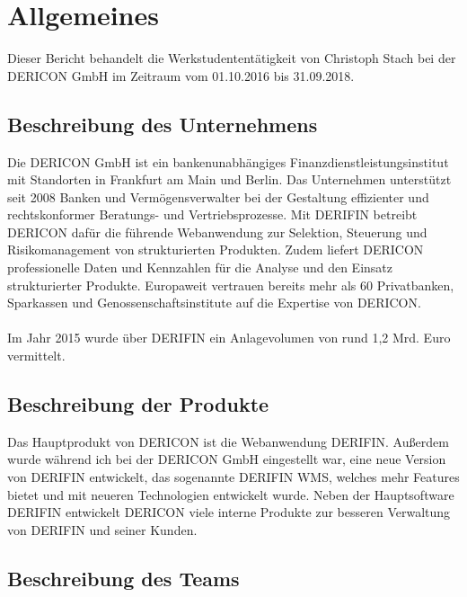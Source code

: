 \documentclass[chapterprefix=false, 12pt, a4paper, oneside, parskip=half, listof=totoc, bibliography=totoc, numbers=noendperiod]{scrbook}
\begin{document}
    \tableofcontents

    \chapter{Allgemeines}

    Dieser Bericht behandelt die Werkstudententätigkeit von Christoph Stach bei der DERICON GmbH im Zeitraum vom 01.10.2016 bis 31.09.2018.

    \section{Beschreibung des Unternehmens}

    Die DERICON GmbH ist ein bankenunabhängiges Finanzdienstleistungsinstitut mit Standorten in Frankfurt am Main und Berlin.
    Das Unternehmen unterstützt seit 2008 Banken und Vermögensverwalter bei der Gestaltung effizienter und rechtskonformer Beratungs- und Vertriebsprozesse.
    Mit DERIFIN betreibt DERICON dafür die führende Webanwendung zur Selektion, Steuerung und Risikomanagement von strukturierten Produkten.
    Zudem liefert DERICON professionelle Daten und Kennzahlen für die Analyse und den Einsatz strukturierter Produkte.
    Europaweit vertrauen bereits mehr als 60 Privatbanken, Sparkassen und Genossenschaftsinstitute auf die Expertise von DERICON.
    \\ \\
    Im Jahr 2015 wurde über DERIFIN ein Anlagevolumen von rund 1,2 Mrd. Euro vermittelt.

    \section{Beschreibung der Produkte}

    Das Hauptprodukt von DERICON ist die Webanwendung DERIFIN. Außerdem wurde während ich bei der DERICON GmbH eingestellt war,
    eine neue Version von DERIFIN entwickelt, das sogenannte DERIFIN WMS, welches mehr Features bietet und mit neueren Technologien entwickelt wurde.
    Neben der Hauptsoftware DERIFIN entwickelt DERICON viele interne Produkte zur besseren Verwaltung von DERIFIN und seiner Kunden.

    \section{Beschreibung des Teams}
\end{document}
